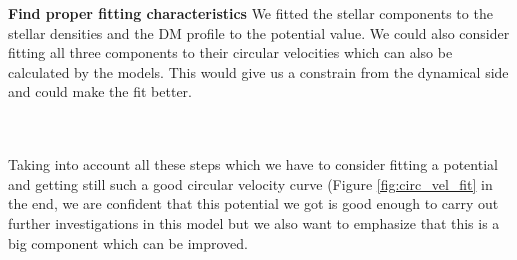 \textbf{Find proper fitting characteristics}
We fitted the stellar components to the stellar densities and the \ac{DM} profile to the potential value. We could also consider fitting all three components to their circular velocities which can also be calculated by the models. This would give us a constrain from the dynamical side and could make the fit better.

\\\\ Taking into account all these steps which we have to consider fitting a potential and getting still such a good circular velocity curve (Figure \ref{fig:circ_vel_fit} in the end, we are confident that this potential we got is good enough to carry out further investigations in this model but we also want to emphasize that this is a big component which can be improved.


